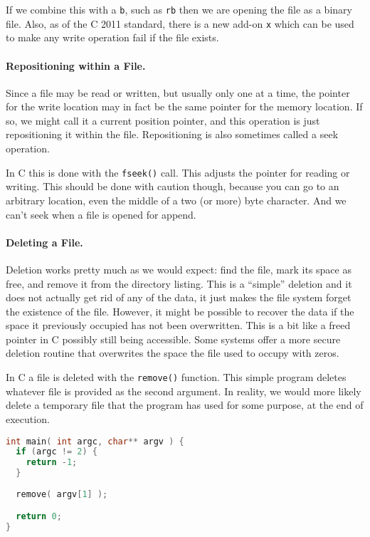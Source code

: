 If we combine this with a \texttt{b}, such as \texttt{rb} then we are opening the file as a binary file. Also, as of the C 2011 standard, there is a new add-on \texttt{x} which can be used to make any write operation fail if the file exists.

\paragraph{Repositioning within a File.} Since a file may be read or written, but usually only one at a time, the pointer for the write location may in fact be the same pointer for the memory location. If so, we might call it a current position pointer, and this operation is just repositioning it within the file. Repositioning is also sometimes called a seek operation.

In C this is done with the \texttt{fseek()} call. This adjusts the pointer for reading or writing. This should be done with caution though, because you can go to an arbitrary location, even the middle of a two (or more) byte character. And we can't seek when a file is opened for append.

\paragraph{Deleting a File.} Deletion works pretty much as we would expect: find the file, mark its space as free, and remove it from the directory listing. This is a ``simple'' deletion and it does not actually get rid of any of the data, it just makes the file system forget the existence of the file. However, it might be possible to recover the data if the space it previously occupied has not been overwritten. This is a bit like a freed pointer in C possibly still being accessible. Some systems offer a more secure deletion routine that overwrites the space the file used to occupy with zeros.

In C a file is deleted with the \texttt{remove()} function. This simple program deletes whatever file is provided as the second argument. In reality, we would more likely delete a temporary file that the program has used for some purpose, at the end of execution. 

\begin{lstlisting}[language=C]
int main( int argc, char** argv ) {
  if (argc != 2) {
    return -1;
  }
  
  remove( argv[1] );

  return 0;
}    
\end{lstlisting}


